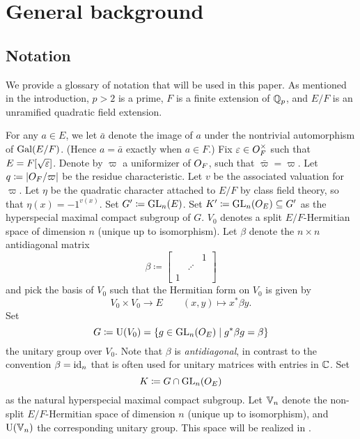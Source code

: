 \chapter{General background}
\label{ch:background}

\section{Notation}
We provide a glossary of notation that will be used in this paper.
As mentioned in the introduction, $p > 2$ is a prime,
$F$ is a finite extension of $\mathbb Q_p$,
and $E/F$ is an unramified quadratic field extension.

\begin{itemize}
  \ii For any $a \in E$, we let $\bar a$ denote the image of $a$
  under the nontrivial automorphism of $\operatorname{Gal}(E/F)$.
  (Hence $a = \bar a$ exactly when $a \in F$.)
  \ii Fix $\varepsilon \in O_F^\times$ such that $E = F[\sqrt{\varepsilon}]$.
  \ii Denote by $\varpi$ a uniformizer of $O_F$, such that $\bar \varpi = \varpi$.
  \ii Let $q \coloneqq |O_F/\varpi|$ be the residue characteristic.
  \ii Let $v$ be the associated valuation for $\varpi$.
  \ii Let $\eta$ be the quadratic character attached to $E/F$ by class field theory,
  so that $\eta(x) = -1^{v(x)}$.
  \ii Set $G' \coloneqq \operatorname{GL}_n(E)$.
  \ii Set $K' \coloneqq \operatorname{GL}_n(O_E) \subseteq G'$ as the hyperspecial maximal compact subgroup of $G$.
  \ii $V_0$ denotes a split $E/F$-Hermitian space of dimension $n$ (unique up to isomorphism).
  \ii Let $\beta$ denote the $n \times n$ antidiagonal matrix
  \[ \beta \coloneqq \begin{bmatrix} && 1 \\ & \iddots \\ 1 \end{bmatrix} \]
  and pick the basis of $V_0$ such that the Hermitian form on $V_0$ is given by
  \[ V_0 \times V_0 \to E \qquad (x,y) \mapsto x^\ast \beta y. \]
  \ii Set
  \[ G \coloneqq \operatorname{U}(V_0) = \{ g \in \operatorname{GL}_n(O_E) \mid g^\ast \beta g = \beta\} \]
  the unitary group over $V_0$.
  Note that $\beta$ is \emph{antidiagonal}, in contrast to the convention $\beta = \operatorname{id}_n$
  that is often used for unitary matrices with entries in $\mathbb C$.
  \ii Set
  \[ K \coloneqq G \cap \operatorname{GL}_n(O_E) \]
  as the natural hyperspecial maximal compact subgroup.
  \ii Let $\mathbb V_n$ denote the non-split $E/F$-Hermitian space of dimension $n$
  (unique up to isomorphism), and $\operatorname{U}(\mathbb V_n)$ the corresponding unitary group.
  This space will be realized in .
\end{itemize}

